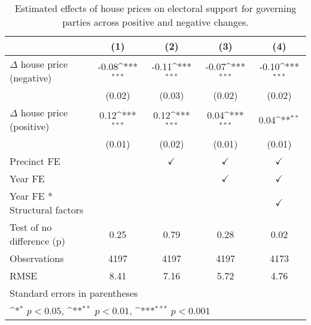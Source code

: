 \begin{table}[htbp]\centering
\def\sym#1{\ifmmode^{#1}\else\(^{#1}\)\fi}
\caption{Estimated effects of house prices on electoral support for governing parties across positive and negative changes.} \label{tab4}
\begin{tabular}{l*{4}{c}}
\hline\hline
                    &\multicolumn{1}{c}{(1)}         &\multicolumn{1}{c}{(2)}         &\multicolumn{1}{c}{(3)}         &\multicolumn{1}{c}{(4)}         \\
\hline
$\Delta$ house price (negative)&       -0.08\sym{***}&       -0.11\sym{***}&       -0.07\sym{***}&       -0.10\sym{***}\\
                    &      (0.02)         &      (0.03)         &      (0.02)         &      (0.02)         \\
[1em]
$\Delta$ house price (positive)&        0.12\sym{***}&        0.12\sym{***}&        0.04\sym{***}&        0.04\sym{**} \\
                    &      (0.01)         &      (0.02)         &      (0.01)         &      (0.01)         \\
[1em]
\hline Precinct  FE &                     &$\checkmark$         &$\checkmark$         &$\checkmark$         \\
[1em]
Year FE             &                     &                     &$\checkmark$         &$\checkmark$         \\
[1em]
Year FE * Structural factors&                     &                     &                     &$\checkmark$         \\
\hline
Test of no difference (p)&        0.25         &        0.79         &        0.28         &        0.02         \\
Observations        &        4197         &        4197         &        4197         &        4173         \\
RMSE                &        8.41         &        7.16         &        5.72         &        4.76         \\
\hline\hline
\multicolumn{5}{l}{\footnotesize Standard errors in parentheses}\\
\multicolumn{5}{l}{\footnotesize \sym{*} \(p<0.05\), \sym{**} \(p<0.01\), \sym{***} \(p<0.001\)}\\
\end{tabular}
\end{table}
